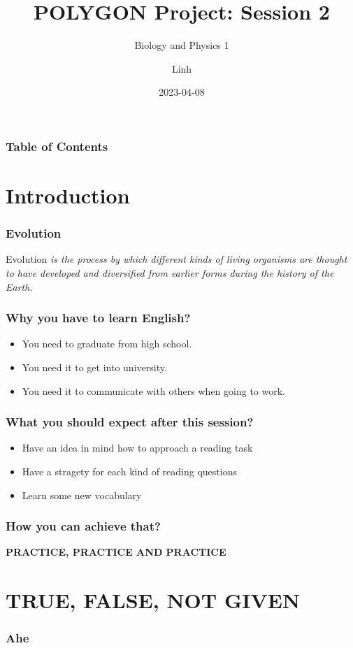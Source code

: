 \documentclass{beamer}
\title{POLYGON Project: Session 2}
\subtitle{Biology and Physics 1}
\author{Linh}
\date{2023-04-08}
\begin{document}
\frame{\titlepage}
\begin{frame}
    \frametitle{Table of Contents}
    \tableofcontents
    \end{frame}
\section{Introduction}
\begin{frame}
\frametitle{Evolution}

\begin{definition}{Evolution}
    \textit{is the process by which different kinds of living organisms are thought to have developed and diversified from earlier forms during the history of the Earth.}
    \end{definition}

\end{frame}
\begin{frame}
    \frametitle{Why you have to learn English?}
    \begin{itemize}
        \item You need to graduate from high school.
        \item You need it to get into university.
        \item You need it to communicate with others when going to work. 
    \end{itemize}
    \end{frame}
\begin{frame}
    \frametitle{What you should expect after this session?}
        \begin{itemize}
            \item Have an idea in mind how to approach a reading task
            \item Have a stragety for each kind of reading questions
            \item Learn some new vocabulary
        \end{itemize}
    \end{frame}    
\begin{frame}
    \frametitle{How you can achieve that?}
        \textbf{PRACTICE, PRACTICE AND PRACTICE}
    \end{frame}
\section{TRUE, FALSE, NOT GIVEN}
\begin{frame}
    \frametitle{Ahe}
        
    \end{frame}
\end{document}
